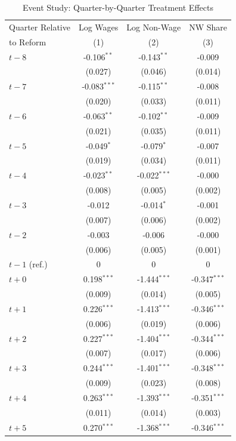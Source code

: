\begin{table}[htbp]
\centering
\begin{threeparttable}
\caption{Event Study: Quarter-by-Quarter Treatment Effects}
\label{tab:eventstudy}
\begin{tabular}{lccc}
\toprule
Quarter Relative & Log Wages & Log Non-Wage & NW Share \\
to Reform & (1) & (2) & (3) \\
\midrule
$t-8$ & -0.106$^{**}$ & -0.143$^{**}$ & -0.009 \\
 & (0.027) & (0.046) & (0.014) \\
$t-7$ & -0.083$^{***}$ & -0.115$^{**}$ & -0.008 \\
 & (0.020) & (0.033) & (0.011) \\
$t-6$ & -0.063$^{**}$ & -0.102$^{**}$ & -0.009 \\
 & (0.021) & (0.035) & (0.011) \\
$t-5$ & -0.049$^{*}$ & -0.079$^{*}$ & -0.007 \\
 & (0.019) & (0.034) & (0.011) \\
$t-4$ & -0.023$^{**}$ & -0.022$^{***}$ & -0.000 \\
 & (0.008) & (0.005) & (0.002) \\
$t-3$ & -0.012 & -0.014$^{*}$ & -0.001 \\
 & (0.007) & (0.006) & (0.002) \\
$t-2$ & -0.003 & -0.006 & -0.000 \\
 & (0.006) & (0.005) & (0.001) \\
$t-1$ (ref.) & 0 & 0 & 0 \\
\midrule
$t+0$ & 0.198$^{***}$ & -1.444$^{***}$ & -0.347$^{***}$ \\
 & (0.009) & (0.014) & (0.005) \\
$t+1$ & 0.226$^{***}$ & -1.413$^{***}$ & -0.346$^{***}$ \\
 & (0.006) & (0.019) & (0.006) \\
$t+2$ & 0.227$^{***}$ & -1.404$^{***}$ & -0.344$^{***}$ \\
 & (0.007) & (0.017) & (0.006) \\
$t+3$ & 0.244$^{***}$ & -1.401$^{***}$ & -0.348$^{***}$ \\
 & (0.009) & (0.023) & (0.008) \\
$t+4$ & 0.263$^{***}$ & -1.393$^{***}$ & -0.351$^{***}$ \\
 & (0.011) & (0.014) & (0.003) \\
$t+5$ & 0.270$^{***}$ & -1.368$^{***}$ & -0.346$^{***}$ \\

\end{tabular}
\end{threeparttable}
\end{table}
